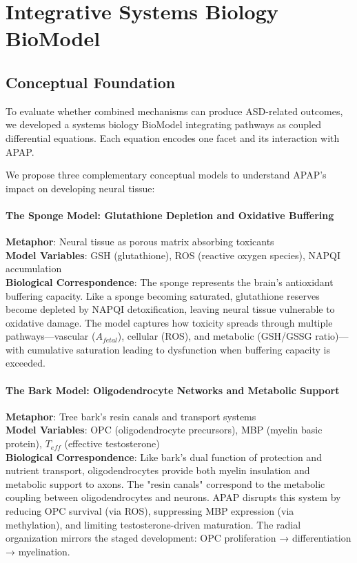 \documentclass[11pt]{article}
\let\oldsection\section
\renewcommand{\section}[1]{\oldsection{#1}\setlength{\leftskip}{0em}}
\let\oldsubsection\subsection
\renewcommand{\subsection}[1]{\oldsubsection{#1}\setlength{\leftskip}{0.75em}}
\begin{document}
\section{Integrative Systems Biology BioModel}

\subsection{Conceptual Foundation}
To evaluate whether combined mechanisms can produce ASD-related outcomes, we developed a systems biology BioModel integrating pathways as coupled differential equations. Each equation encodes one facet and its interaction with APAP.

We propose three complementary conceptual models to understand APAP's impact on developing neural tissue:

\paragraph{The Sponge Model: Glutathione Depletion and Oxidative Buffering}
\textbf{Metaphor}: Neural tissue as porous matrix absorbing toxicants\\
\textbf{Model Variables}: GSH (glutathione), ROS (reactive oxygen species), NAPQI accumulation\\
\textbf{Biological Correspondence}: The sponge represents the brain's antioxidant buffering capacity. Like a sponge becoming saturated, glutathione reserves become depleted by NAPQI detoxification, leaving neural tissue vulnerable to oxidative damage. The model captures how toxicity spreads through multiple pathways—vascular ($A_{fetal}$), cellular (ROS), and metabolic (GSH/GSSG ratio)—with cumulative saturation leading to dysfunction when buffering capacity is exceeded.

\paragraph{The Bark Model: Oligodendrocyte Networks and Metabolic Support}
\textbf{Metaphor}: Tree bark's resin canals and transport systems\\
\textbf{Model Variables}: OPC (oligodendrocyte precursors), MBP (myelin basic protein), $T_{eff}$ (effective testosterone)\\
\textbf{Biological Correspondence}: Like bark's dual function of protection and nutrient transport, oligodendrocytes provide both myelin insulation and metabolic support to axons. The "resin canals" correspond to the metabolic coupling between oligodendrocytes and neurons. APAP disrupts this system by reducing OPC survival (via ROS), suppressing MBP expression (via methylation), and limiting testosterone-driven maturation. The radial organization mirrors the staged development: OPC proliferation → differentiation → myelination.
\end{document}
